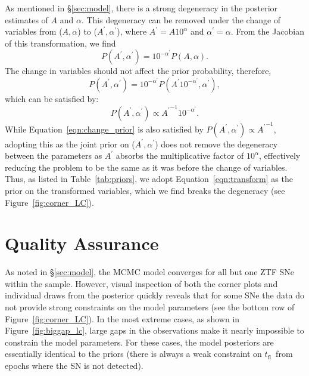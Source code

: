 \documentclass[twocolumn]{./aastex63}
\newcommand{\tfl}{$t_\mathrm{fl}$}
\begin{document}
As mentioned in \S\ref{sec:model}, there is a strong degeneracy in the posterior
estimates of $A$ and $\alpha$. This degeneracy can be removed under the change
of variables from ($A, \alpha$) to ($A^\prime, \alpha^\prime$), where $A^\prime
= A 10^\alpha$ and $\alpha^\prime = \alpha$. From the Jacobian of this
transformation, we find
$$P(A^\prime, \alpha^\prime) = 10^{-\alpha^\prime} P(A,\alpha).$$
The change in variables should not affect the prior probability, therefore,
\begin{equation} 
    P(A^\prime, \alpha^\prime) = 10^{-\alpha^\prime} P(A^\prime
10^{-\alpha^\prime},\alpha^\prime), 
\label{eqn:change_prior} 
\end{equation}
which can be satisfied by:
\begin{equation}
    P(A^\prime, \alpha^\prime) \propto {A^\prime}^{-1} 10^{-\alpha^\prime}.
\label{eqn:transform}
\end{equation}
While Equation~\ref{eqn:change_prior} is also satisfied by $P(A^\prime,
\alpha^\prime) \propto {A^\prime}^{-1}$, adopting this as the joint prior on
($A^\prime, \alpha^\prime$) does not remove the degeneracy between the
parameters as $A^\prime$ absorbs the multiplicative factor of $10^\alpha$,
effectively reducing the problem to be the same as it was before the change of
variables. Thus, as listed in Table~\ref{tab:priors}, we adopt
Equation~\ref{eqn:transform} as the prior on the transformed variables, which we
find breaks the degeneracy (see Figure~\ref{fig:corner_LC}).

\section{Quality Assurance}\label{sec:qa}

As noted in \S\ref{sec:model}, the MCMC model converges for all but one ZTF
SNe within the sample. However, visual inspection of both the corner plots and
individual draws from the posterior quickly reveals that for some SNe the data
do not provide strong constraints on the model parameters (see the bottom row
of Figure~\ref{fig:corner_LC}). In the most extreme cases, as shown in
Figure~\ref{fig:biggap_lc}, large gaps in the observations make it nearly
impossible to constrain the model parameters. For these cases, the model
posteriors are essentially identical to the priors (there is always a weak
constraint on \tfl\ from epochs where the SN is not detected).
\end{document}
